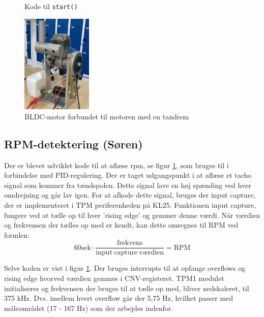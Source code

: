 \begin{figure}[h]
  \centering
  
  \caption{Kode til \lstinline{start()}}
  \label{fig:kodes3}
\end{figure}

\begin{figure}[h]
  \centering
  \includegraphics[width=0.3\textwidth]{./figurer/mots6.png}
  \caption{BLDC-motor forbundet til motoren med en tandrem}
  \label{fig:mots6}
\end{figure}
\clearpage
\subsection{RPM-detektering (Søren)}
\label{sec:rpm-detektering}

Der er blevet udviklet kode til at aflæse rpm, se figur \ref{fig:kodes3}, som bruges til i forbindelse med PID-regulering. Der er taget udgangspunkt i at aflæse et tacho signal som kommer fra tændspolen. Dette signal lave en høj spænding ved hver omdrejning og går lav igen. For at afkode dette signal, bruges der input capture, der er implementeret i TPM periferenheden på KL25. Funktionen input capture, fungere ved at tælle op til hver ’rising edge’ og gemmer denne værdi. Når værdien og frekvensen der tælles op med er kendt, kan dette omregnes til RPM ved formlen:
\begin{equation}
  \label{eq:4}
 60 \mathrm{sek} \cdot \frac{\mathrm{frekvens}}{\mathrm{input\ capture\ værdien}}=\mathrm{RPM} 
\end{equation}

Selve koden er vist i figur \ref{fig:kodes3}. Der bruges interrupts til at opfange overflows og rising edge hvorved værdien gemmes i CNV-registeret. TPM1 modulet initialiseres og frekvensen der bruges til at tælle op med, bliver nedskaleret, til 375 kHz. Dvs. imellem hvert overflow går der 5,75 Hz, hvilket passer med måleområdet (17 - 167 Hz) som der arbejdes indenfor.

